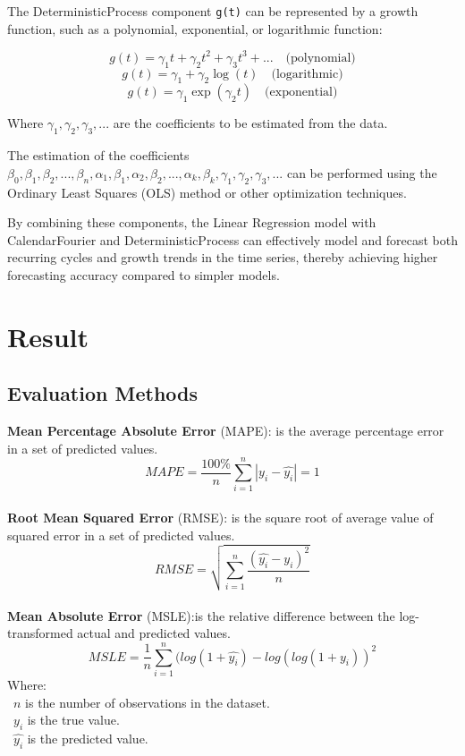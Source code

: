 \documentclass{ieeeojies}
\begin{document}
The DeterministicProcess component \verb|g(t)| can be represented by a growth function, such as a polynomial, exponential, or logarithmic function:

 $$g(t) = \gamma_1t + \gamma_2t^2 + \gamma_3t^3 + ... \quad \text{(polynomial)}$$
$$g(t) = \gamma_1 + \gamma_2\log(t) \quad \text{(logarithmic)}$$
$$g(t) = \gamma_1\exp(\gamma_2t) \quad \text{(exponential)}$$

Where $\gamma_1, \gamma_2, \gamma_3, ...$ are the coefficients to be estimated from the data.

The estimation of the coefficients $\beta_0, \beta_1, \beta_2, ..., \beta_n, \alpha_1, \beta_1, \alpha_2, \beta_2, ..., \alpha_k, \beta_k, \gamma_1, \gamma_2, \gamma_3, ...$ can be performed using the Ordinary Least Squares (OLS) method or other optimization techniques.

 By combining these components, the Linear Regression model with CalendarFourier and DeterministicProcess can effectively model and forecast both recurring cycles and growth trends in the time series, thereby achieving higher forecasting accuracy compared to simpler models. 
 
\section{Result}
\subsection{Evaluation Methods}
\textbf{Mean Percentage Absolute Error} (MAPE): is the average percentage error in a set of predicted values.\\
\[MAPE=\frac{100\%}{n}  \sum_{i=1}^{n} |y_i-\hat{y_i} |  = 1 \]\\
\textbf{Root Mean Squared Error} (RMSE): is the square root of average value of squared error in a set of predicted values.\\
\[RMSE=\sqrt{\sum_{i=1}^{n} \frac{(\hat{y_i}-y_i )^2}{n} }\]\\
\textbf{Mean Absolute Error} (MSLE):is the relative difference between the log-transformed actual and predicted values.\\
\[MSLE=\frac{1}{n}\sum_{i=1}^{n}(log(1+\hat{y_i})-log(log(1+y_i))^2\]
Where: \\
	\indent\textbullet\ \(n\) is the number of observations in the dataset.\\
	\indent\textbullet\ \(y_i\)  is the true value.\\
	\indent\textbullet\ \(\hat{y_i}\) is the predicted value.
\end{document}
